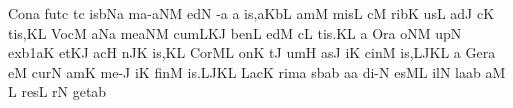 \spatium
\divisiofinalis
\spatium
\sgn Con\punctum a\egn
\sgn fut\punctum c\egn
{}t\punctum c\egn
\sgn {}is\porrectus bNa\egn
\spatium
\sgn ma{-}\climacus aNM\egn
{}ed\punctum N\egn
\sgn {}{\'\i}-\punctum a\egn
\custos a
\lineaproxima
{}i{s,}\clivis aK\augmentumduplex bL\egn
\spatium
\divisiominor
\spatium
{}am\punctum M\egn
\sgn mis\punctum L\egn
\spatium
{}c\punctum M\egn
\sgn rib\punctum K\egn
\sgn {}us\punctum L\egn
\spatium
\sgn {}ad\punctum J\egn
{}c\punctum K\egn
\sgn ti{s,}\punctum K\augmentum L\egn
\spatium
\divisiominor
\spatium
\sgn Voc\punctum M\egn
\sgn {}a{}\pes Na\egn
\spatium
\sgn me{}\climacus aNM\egn
\spatium
\sgn cum\climacus LKJ\egn
\spatium
\sgn ben\punctum L\egn
\sgn {}ed\punctum M\egn
\sgn {}{\'\i}c\punctum L\egn
\sgn ti{s.}\punctum K\augmentum L\egn
\spatium
\divisiofinalis
\spatium
\custos a
\Internote
\lineaproxima
\sgn {}Or\punctum a\egn
\sgn {}o{}\clivis NM\egn
\spatium
{}up\punctum N\egn
{}ex\episem b1\clivis aK\egn
\spatium
\sgn {}et\clivis KJ\egn
\spatium
\sgn {}ac\punctum H\egn
{}n\pes JK\egn
\sgn {}i{s,}\punctum K\augmentum L\egn
\spatium
\divisiominor
\spatium
\sgn Cor\clivis ML\egn
\spatium
{}o{n}\punctum K\egn
{}t\punctum J\egn
\sgn {}um\punctum H\egn
\spatium
{}as\punctum J\egn
\sgn {}i{}\punctum K\egn
\spatium
\sgn cin\punctum M\egn
\sgn {}i{s,}\porrectus LJK\augmentum L\egn
\spatium
\divisiominor
\spatium
\custos a
\Internote
\lineaproxima
\sgn Ger\punctum a\egn
\sgn {}e{}\punctum M\egn
\spatium
\sgn cur\punctum N\egn
\sgn {}am\punctum K\egn
\spatium
\sgn me-\punctum J\egn
\sgn {}i{}\punctum K\egn
\spatium
\sgn fin\punctum M\egn
\sgn {}i{s.}\porrectus LJK\augmentum L\egn
\spatium
\divisiofinalis
\spatium
\sgn Lac\punctum K\egn
\sgn rim\punctum a\egn
{}s\bmolle b\pes ab\egn
\sgn {}a{}\punctum a\egn
\spatium
\sgn di-\punctum N\egn
\sgn {}es{}\clivis ML\egn
\spatium
\sgn {}il\punctum N\egn
\sgn la{}\punctum a\augmentum b\egn
\spatium
\divisiominor
\spatium
{}a{}\punctum M\egn
\spatium
\custos L
\lineaproxima
\sgn res\punctum L\egn
{}r\punctum N\egn
\sgn get\punctum a\augmentum b\egn
